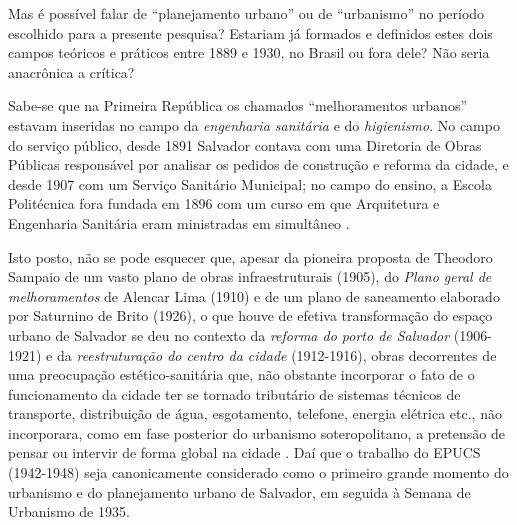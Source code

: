 Mas é possível falar de ``planejamento urbano'' ou de ``urbanismo'' no período escolhido para a presente pesquisa? Estariam já formados e definidos estes dois campos teóricos e práticos entre 1889 e 1930, no Brasil ou fora dele?  Não seria anacrônica a crítica?

Sabe-se que na Primeira República os chamados ``melhoramentos urbanos'' estavam inseridas no campo da \textit{engenharia sanitária} e do \textit{higienismo}. No campo do serviço público, desde 1891 Salvador contava com uma Diretoria de Obras Públicas responsável por analisar os pedidos de construção e reforma da cidade, e desde 1907 com um Serviço Sanitário Municipal; no campo do ensino, a Escola Politécnica fora fundada em 1896 com um curso em que Arquitetura e Engenharia Sanitária eram ministradas em simultâneo \cite{fernandessampaiogomes1999}. 

Isto posto, não se pode esquecer que, apesar da pioneira proposta de Theodoro Sampaio de um vasto plano de obras infraestruturais (1905), do \textit{Plano geral de melhoramentos} de Alencar Lima (1910) e de um plano de saneamento elaborado por Saturnino de Brito (1926), o que houve de efetiva transformação do espaço urbano de Salvador se deu no contexto da \textit{reforma do porto de Salvador} (1906-1921) e da \textit{reestruturação do centro da cidade} (1912-1916), obras decorrentes de uma preocupação estético-sanitária que, não obstante incorporar o fato de o funcionamento da cidade ter se tornado tributário de sistemas técnicos de transporte, distribuição de água, esgotamento, telefone, energia elétrica etc., não incorporara, como em fase posterior do urbanismo soteropolitano, a pretensão de pensar ou intervir de forma global na cidade \cite{fernandessampaiogomes1999}. Daí que o trabalho do EPUCS (1942-1948) seja canonicamente considerado como o primeiro grande momento do urbanismo e do planejamento urbano de Salvador, em seguida à Semana de Urbanismo de 1935.

